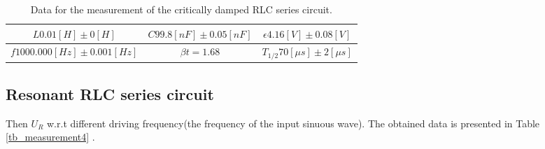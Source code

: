 \documentclass[12pt, a4paper, oneside]{article}
\begin{document}
\begin{table*}[!ht]
  \centering
  \begin{tabular}{|c|c|c|}
    \hline
    $L 0.01 [H]\pm 0[H]$ & $C 99.8 [nF]\pm 0.05[nF]$ & $\epsilon 4.16 [V]\pm 0.08[V]$ \\ \hline
    $f 1000.000 [Hz]\pm 0.001[Hz]$ & $\beta t = 1.68 $ & $T_{1/2} 70 [\mu s]\pm 2[\mu s]$\\ \hline
  \end{tabular}
  \caption{Data for the measurement of the critically damped RLC series circuit.}
  \label{tb_measurement3}
\end{table*}

\subsection{Resonant RLC series circuit}
\label{sec_measurement}

Then $U_R$ w.r.t different driving frequency(the frequency of the input sinuous wave). The obtained data is presented in Table \ref{tb_measurement4} .
\end{document}
